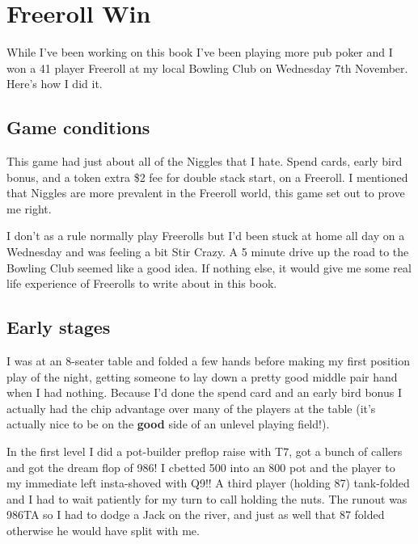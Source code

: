 \chapter{Freeroll Win}


While I've been working on this book I've been playing more
pub poker and I won a 41 player Freeroll at my local
Bowling Club on Wednesday 7th November. Here's how I
did it.


\section{Game conditions}

This game had just about all of the Niggles that I hate.
Spend cards, early bird bonus, and a token extra \$2 fee
for double stack start, on a Freeroll. I mentioned that
Niggles are more prevalent in the Freeroll world, this
game set out to prove me right.

I don't as a rule normally play Freerolls but I'd been stuck
at home all day on a Wednesday and was feeling a bit Stir Crazy.
A 5 minute drive up the road to the Bowling Club seemed like
a good idea. If nothing else, it would give me some real life
experience of Freerolls to write about in this book.


\section{Early stages}

I was at an 8-seater table and folded a few hands before
making my first position play of the night, getting someone
to lay down a pretty good middle pair hand when I had nothing.
Because I'd done the spend card and an early bird bonus I actually
had the chip advantage over many of the players at the table
(it's actually nice to be on the \textbf{good} side of an
unlevel playing field!). 

In the first level I did a pot-builder preflop raise with T7,
got a bunch of callers and got the dream flop of 986! I cbetted
500 into an 800 pot and the player to my immediate left
insta-shoved with Q9!! A third player (holding 87) tank-folded
and I had to wait patiently for my turn to call holding the nuts.
The runout was 986TA so I had to dodge a Jack on the river,
and just as well that 87 folded otherwise he would have split with me.

